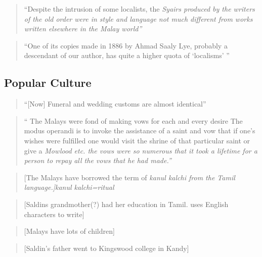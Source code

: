 \begin{quote}
    ``Despite the intrusion of some localists, the \em Syairs \em produced by the writers of the old order \el were in style and language not much different from works written elsewhere in the Malay world''\citep[149]{Hussainmiya1990}
\end{quote}


\begin{quote}
    ``One of its copies made in 1886 by Ahmad Saaly Lye, probably a descendant of our author, has quite a higher quota of `localisms' ''\citep[124]{Hussainmiya1987}
\end{quote}



\subsection{Popular Culture}\label{sec:slmbg:PopularCulture}

\begin{quote}
    ``[Now] Funeral and wedding customs are almost identical'' \citet[1]{Saldin2003}
\end{quote}

\begin{quote}
    `` The Malays were fond of making vows for each and every desire \el The modus operandi is to invoke the assistance of a saint and vow that if one's wishes were fulfilled one would visit the shrine of that particular saint or give a \em Mowlood \em etc. \el the vows were so numerous that it took a lifetime for a person to repay all the vows that he had made.''\citet[13]{Saldin2003}
\end{quote}

\begin{quote}
    [The Malays have borrowed the term of \em kanul kalchi \em from the Tamil language.]\citet[13]{Saldin2003}kanul kalchi=ritual
\end{quote}

\begin{quote}
    [Saldins grandmother(?) had her education in Tamil. uses English characters to write] \citet[14]{Saldin2003}
\end{quote}

\begin{quote}
    [Malays have lots of children]\citet[11,15]{Saldin2003}
\end{quote}

\begin{quote}
    [Saldin's father went to Kingswood college in Kandy]
\end{quote}

